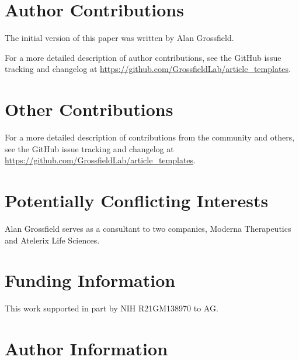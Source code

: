 \documentclass[9pt,training]{livecoms}
\newcommand{\githubrepository}{\url{https://github.com/GrossfieldLab/article_templates}}
\begin{document}
\section{Author Contributions}
%
The initial version of this paper was written by Alan Grossfield.


For a more detailed description of author contributions,
see the GitHub issue tracking and changelog at \githubrepository.

\section{Other Contributions}
%


For a more detailed description of contributions from the community and others, see the GitHub issue tracking and changelog at \githubrepository.

\section{Potentially Conflicting Interests}

Alan Grossfield serves as a consultant to two companies, Moderna Therapeutics
and Atelerix Life Sciences.

\section{Funding Information}
This work supported in part by NIH R21GM138970 to AG.

\section*{Author Information}
\makeorcid




\end{document}
